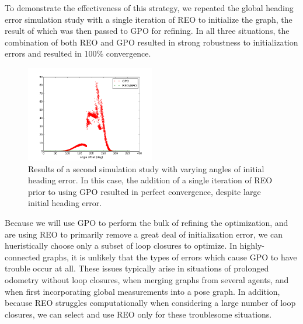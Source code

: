 To demonstrate the effectiveness of this strategy, we repeated the global heading error simulation study with a single iteration of REO to initialize the graph, the result of which was then passed to GPO for refining.  In all three situations, the combination of both REO and GPO resulted in strong robustness to initialization errors and resulted in 100\% convergence.

\begin{figure}[H]
  \includegraphics[width=0.5\textwidth]{figures/combined_global_heading_results.png}
  \caption{Results of a second simulation study with varying angles of initial heading error.  In this case, the addition of a single iteration of REO prior to using GPO resulted in perfect convergence, despite large initial heading error.}
  \label{fig:combined_global_heading_results}
\end{figure}

Because we will use GPO to perform the bulk of refining the optimization, and are using REO to primarily remove a great deal of initialization error, we can hueristically choose only a subset of loop closures to optimize.  In highly-connected graphs, it is unlikely that the types of errors which cause GPO to have trouble occur at all.  These issues typically arise in situations of prolonged odometry without loop closures, when merging graphs from several agents, and when first incorporating global measurements into a pose graph.  In addition, because REO struggles computationally when considering a large number of loop closures, we can select and use REO only for these troublesome situations.

